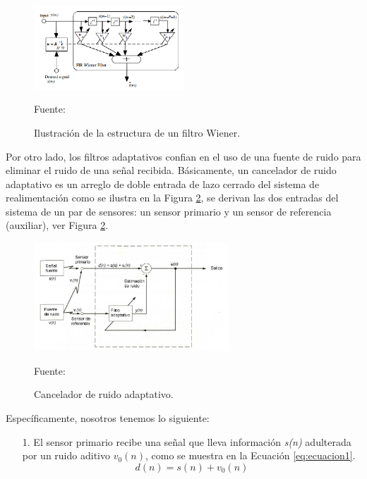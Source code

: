 \begin{enumerate}
\begin{enumerate}
\newpage
\begin{figure}[ht]
\begin{center}
\includegraphics[width=0.5\textwidth]{Imagenes/Cap2/image014}
\end{center}
\begin{center}
\vskip -0.5cm
\caption{\small{Ilustración de la estructura de un filtro Wiener.}}
\label{fig:figura2.14}
{\small{Fuente: \cite{shubhra}}}
\end{center}
\end{figure}
\vskip -0.5cm
Por otro lado, los filtros adaptativos confian en el uso de una fuente de ruido para eliminar el ruido de una señal recibida. Básicamente, un cancelador de ruido adaptativo es un arreglo de doble entrada de lazo cerrado del sistema de realimentación como se ilustra en la Figura \ref{fig:figura2.15}, se derivan las dos entradas del sistema de un par de sensores: un sensor primario y un sensor de referencia (auxiliar), ver Figura \ref{fig:figura2.15}.

\begin{figure}[ht]
\begin{center}
\includegraphics[width=0.65\textwidth]{Imagenes/Cap2/image015}
\end{center}
\begin{center}
\vskip -0.5cm
\caption{\small{Cancelador de ruido adaptativo.}}
\label{fig:figura2.15}
{\small{Fuente: \cite{walter}}}
\end{center}
\end{figure}

Específicamente, nosotros tenemos lo siguiente:
\begin{enumerate}
\item[1.]El sensor primario recibe una señal que lleva información \textit{s(n)} adulterada por un ruido aditivo \textit{$v_{0}(n)$}, como se muestra en la Ecuación \eqref{eq:ecuacion1}.
\vskip -1cm
\begin{equation}
\label{eq:ecuacion1}
d(n) = s(n) + v_{0}(n)
\end{equation}


\end{enumerate}
\end{enumerate}
\end{enumerate}
